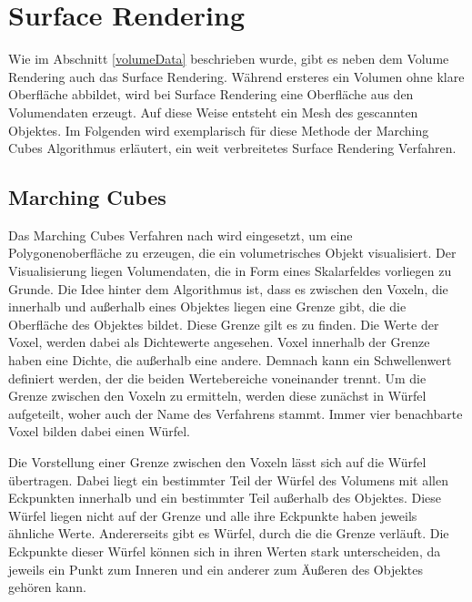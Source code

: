 \section{Surface Rendering}		 %

Wie im Abschnitt \ref{volumeData} beschrieben wurde, gibt es neben dem Volume Rendering auch das Surface Rendering. Während ersteres ein Volumen ohne klare Oberfläche abbildet, wird bei Surface Rendering eine Oberfläche aus den Volumendaten erzeugt. Auf diese Weise entsteht ein Mesh des gescannten Objektes.
Im Folgenden wird exemplarisch für diese Methode der Marching Cubes Algorithmus erläutert, ein weit verbreitetes Surface Rendering Verfahren.



\subsection{Marching Cubes}
\label{marchingCubes}

Das Marching Cubes Verfahren nach \cite{Lorensen87} wird eingesetzt, um eine Polygonenoberfläche zu erzeugen, die ein volumetrisches Objekt visualisiert. 
Der Visualisierung liegen Volumendaten, die in Form eines Skalarfeldes vorliegen zu Grunde.
Die Idee hinter dem Algorithmus ist, dass es zwischen den Voxeln, die innerhalb und außerhalb eines Objektes liegen eine Grenze gibt, die die Oberfläche des Objektes bildet. Diese Grenze gilt es zu finden. 
Die Werte der Voxel, werden dabei als Dichtewerte angesehen. Voxel innerhalb der Grenze haben eine Dichte, die außerhalb eine andere. Demnach kann ein Schwellenwert definiert werden, der die beiden Wertebereiche voneinander trennt.
Um die Grenze zwischen den Voxeln zu ermitteln, werden diese zunächst in Würfel aufgeteilt, woher auch der Name des Verfahrens stammt. Immer vier benachbarte Voxel bilden dabei einen Würfel.  

Die Vorstellung einer Grenze zwischen den Voxeln lässt sich auf die Würfel übertragen. Dabei liegt ein bestimmter Teil der Würfel des Volumens mit allen Eckpunkten innerhalb und ein bestimmter Teil außerhalb des Objektes. Diese Würfel liegen nicht auf der Grenze und alle ihre Eckpunkte haben jeweils ähnliche Werte. Andererseits gibt es Würfel, durch die die Grenze verläuft. Die Eckpunkte dieser Würfel können sich in ihren Werten stark unterscheiden, da jeweils ein Punkt zum Inneren und ein anderer zum Äußeren des Objektes gehören kann. 

